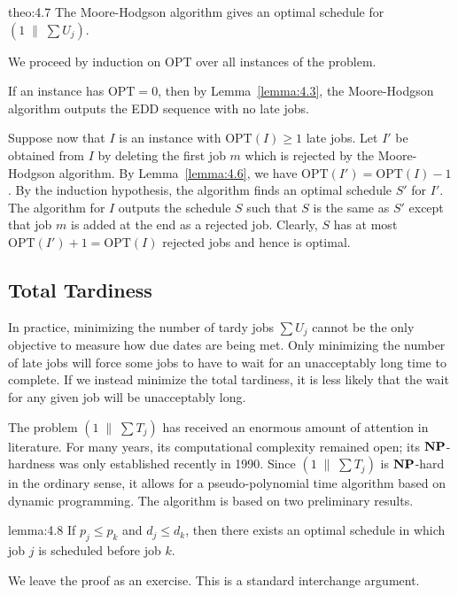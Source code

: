 \begin{theo}{theo:4.7}
    The Moore-Hodgson algorithm gives an optimal schedule for 
    $(1\;\|\;\sum U_j)$. 
\end{theo}
\begin{pf}
    We proceed by induction on $\text{OPT}$ over all instances of the problem. 

    If an instance has $\text{OPT} = 0$, then by Lemma~\ref{lemma:4.3}, the 
    Moore-Hodgson algorithm outputs the EDD sequence with no late jobs. 

    Suppose now that $I$ is an instance with $\text{OPT}(I) \geq 1$ late 
    jobs. Let $I'$ be obtained from $I$ by deleting the first job $m$ 
    which is rejected by the Moore-Hodgson algorithm. By Lemma~\ref{lemma:4.6}, 
    we have $\text{OPT}(I') = \text{OPT}(I) - 1$. By the induction hypothesis, 
    the algorithm finds an optimal schedule $S'$ for $I'$. The algorithm 
    for $I$ outputs the schedule $S$ such that $S$ is the same as $S'$ 
    except that job $m$ is added at the end as a rejected job. Clearly, 
    $S$ has at most $\text{OPT}(I') + 1 = \text{OPT}(I)$ rejected jobs 
    and hence is optimal. 
\end{pf}

\subsection{Total Tardiness} \label{subsec:4.3}
In practice, minimizing the number of tardy jobs $\sum U_j$ cannot be the 
only objective to measure how due dates are being met. Only minimizing 
the number of late jobs will force some jobs to have to wait for an 
unacceptably long time to complete. If we instead minimize the total 
tardiness, it is less likely that the wait for any given job will be 
unacceptably long. 

The problem $(1\;\|\;\sum T_j)$ has received an enormous amount of attention 
in literature. For many years, its computational complexity remained open; 
its $\operatorname{\textbf{NP}}$-hardness was only established recently in 1990. Since 
$(1\;\|\;\sum T_j)$ is $\operatorname{\textbf{NP}}$-hard in the ordinary sense, it allows for a 
pseudo-polynomial time algorithm based on dynamic programming. The 
algorithm is based on two preliminary results. 

\begin{lemma}{lemma:4.8}
    If $p_j \leq p_k$ and $d_j \leq d_k$, then there exists an optimal schedule 
    in which job $j$ is scheduled before job $k$. 
\end{lemma}
\begin{pf}
    We leave the proof as an exercise. This is a standard interchange 
    argument. 
\end{pf}

